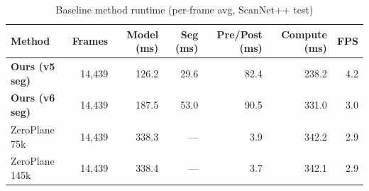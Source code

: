 \begin{table}[t]
  \centering
  \caption{Baseline method runtime (per-frame avg, ScanNet++ test)}
  \label{tab:baseline_runtime}
  \begin{tabular}{l r r r r r r}
    \toprule
    Method & Frames & Model (ms) & Seg (ms) & Pre/Post (ms) & Compute (ms) & FPS \\
    \midrule
    \textbf{Ours (v5 seg)} & 14,439 & 126.2 & 29.6 & 82.4 & 238.2 & 4.2 \\
    \textbf{Ours (v6 seg)} & 14,439 & 187.5 & 53.0 & 90.5 & 331.0 & 3.0 \\
    ZeroPlane 75k & 14,439 & 338.3 & --- & 3.9 & 342.2 & 2.9 \\
    ZeroPlane 145k & 14,439 & 338.4 & --- & 3.7 & 342.1 & 2.9 \\
    \bottomrule
  \end{tabular}
\end{table}
